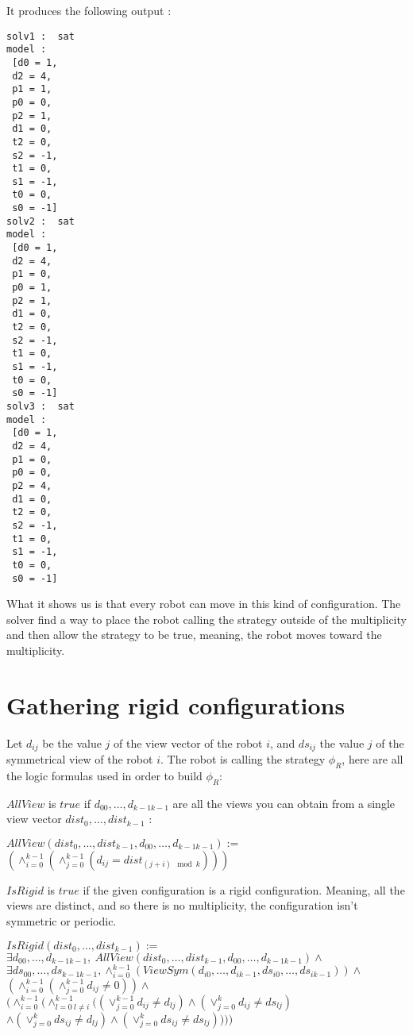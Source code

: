 \documentclass{article}
\begin{document}
It produces the following output :

\begin{lstlisting}
solv1 :  sat
model :
 [d0 = 1,
 d2 = 4,
 p1 = 1,
 p0 = 0,
 p2 = 1,
 d1 = 0,
 t2 = 0,
 s2 = -1,
 t1 = 0,
 s1 = -1,
 t0 = 0,
 s0 = -1]
solv2 :  sat
model :
 [d0 = 1,
 d2 = 4,
 p1 = 0,
 p0 = 1,
 p2 = 1,
 d1 = 0,
 t2 = 0,
 s2 = -1,
 t1 = 0,
 s1 = -1,
 t0 = 0,
 s0 = -1]
solv3 :  sat
model :
 [d0 = 1,
 d2 = 4,
 p1 = 0,
 p0 = 0,
 p2 = 4,
 d1 = 0,
 t2 = 0,
 s2 = -1,
 t1 = 0,
 s1 = -1,
 t0 = 0,
 s0 = -1]
\end{lstlisting}

What it shows us is that every robot can move in this kind of configuration. The solver find a way to place the robot calling the strategy outside of the multiplicity and then allow the strategy to be true, meaning, the robot moves toward the multiplicity.

\section{Gathering rigid configurations}

Let $d_{ij}$ be the value $j$ of the view vector of the robot $i$, and $ds_{ij}$ the value $j$ of the symmetrical 
view of the robot $i$.
The robot is calling the strategy $\phi_R$, here are all the logic formulas used in order to build $\phi_R$:

$AllView$ is $true$ if $d_{00}, \ldots ,d_{k-1k-1}$ are all the views you can obtain from a single view vector $dist_{0}, \ldots ,dist_{k-1}$ :

\begin{center}
    
$AllView(dist_{0}, \ldots ,dist_{k-1}, d_{00}, \ldots ,d_{k-1k-1}):=$\\
$(\land_{i=0}^{k-1} (\land_{j=0}^{k-1} (d_{ij} = dist_{(j+i) \mod{k}}) ) )$
\end{center}

$IsRigid$ is $true$ if the given configuration is a rigid configuration. Meaning, all the views are distinct, and so there is no multiplicity, the configuration isn't symmetric or periodic.

\begin{center}

$IsRigid(dist_{0}, \ldots ,dist_{k-1}):=$\\
$\exists d_{00}, \ldots ,d_{k-1k-1},\ AllView(dist_{0}, \ldots ,dist_{k-1}, d_{00}, \ldots ,d_{k-1k-1})\land$\\
$\exists ds_{00}, \ldots ,ds_{k-1k-1}, \land_{i=0}^{k-1} (ViewSym(d_{i0}, \ldots , d_{ik-1}, ds_{i0}, \ldots , ds_{ik-1}))\land$\\
$(\land_{i=0}^{k-1}(\land_{j=0}^{k-1}d_{ij}\not=0))\land $\\%
$( \land_{i=0}^{k-1}(
\land_{l=0\ l\not=i}^{k-1}(
(\lor_{j=0}^{k-1}d_{ij} \not= d_{lj})
\land (\lor_{j=0}^{k}d_{ij} \not= ds_{lj})$\\
$\land (\lor_{j=0}^{k}ds_{ij} \not= d_{lj})
\land (\lor_{j=0}^{k}ds_{ij} \not= ds_{lj})
) ))$\\%
\end{center}
\end{document}
